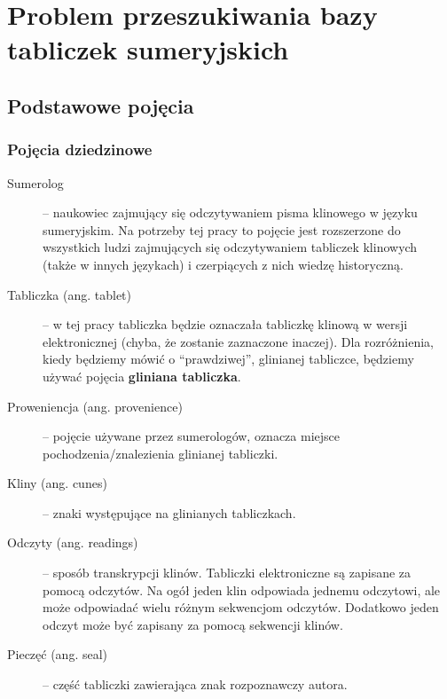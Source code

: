 \chapter{Problem przeszukiwania bazy tabliczek sumeryjskich}
\section{Podstawowe pojęcia}\label{r:pojecia}
\subsection{Pojęcia dziedzinowe}
\begin{description}
 \item[Sumerolog] -- naukowiec zajmujący się odczytywaniem pisma klinowego w języku sumeryjskim. Na potrzeby tej pracy
		      to pojęcie jest rozszerzone do wszystkich ludzi zajmujących się odczytywaniem tabliczek klinowych 
		      (także w innych językach) i czerpiących z nich wiedzę historyczną.
 \item[Tabliczka (ang. tablet)] -- w tej pracy tabliczka będzie oznaczała tabliczkę klinową w wersji elektronicznej 
		  (chyba, że zostanie zaznaczone inaczej). Dla rozróżnienia, kiedy będziemy mówić o ``prawdziwej'', 
		  glinianej tabliczce, będziemy używać pojęcia \textbf{gliniana tabliczka}.
 \item[Proweniencja (ang. provenience)] -- pojęcie używane przez sumerologów, oznacza miejsce pochodzenia/znalezienia 
		    glinianej tabliczki.
 \item[Kliny (ang. cunes)] -- znaki występujące na glinianych tabliczkach.
 \item[Odczyty (ang. readings)] -- sposób transkrypcji klinów. Tabliczki elektroniczne są zapisane za pomocą odczytów. 
Na ogół jeden klin odpowiada jednemu odczytowi, ale może odpowiadać wielu różnym sekwencjom odczytów. 
Dodatkowo jeden odczyt może być zapisany za pomocą sekwencji klinów.
 \item[Pieczęć (ang. seal)] -- część tabliczki zawierająca znak rozpoznawczy autora.
\end{description}

